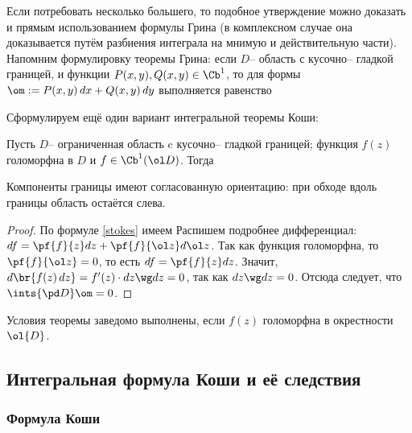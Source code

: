 \documentclass[a4paper]{article}
\begin{document}
Если потребовать несколько большего, то подобное утверждение можно доказать и прямым использованием
формулы Грина (в комплексном случае она доказывается путём разбиения интеграла на мнимую и действительную части).
Напомним формулировку теоремы Грина: если $D$-- область с кусочно-- гладкой границей, и функции $P(x,y), Q(x,y) \in \Cb^1$,
то для формы $\om := P(x,y)\,dx + Q(x,y)\,dy$ выполняется равенство

Сформулируем ещё один вариант интегральной теоремы Коши:
\begin{theorem}[Коши]
Пусть $D$-- ограниченная область c кусочно-- гладкой границей; функция $f(z)$ голоморфна в $D$ и $f\in \Cb^1(\ol D)$.
Тогда
\end{theorem}
\begin{note}
Компоненты границы имеют согласованную ориентацию: при обходе вдоль границы область остаётся слева.
\end{note}
\begin{proof}
По формуле \eqref{stokes} имеем
Распишем подробнее дифференциал: $df = \pf{f}{z}dz + \pf{f}{\ol z}d\ol z$. Так как функция голоморфна, то
$\pf{f}{\ol z} = 0$, то есть $df = \pf{f}{z}dz$.
Значит, $d\br{f(z)\,dz} = f'(z) \cdot dz \wg dz = 0$, так как $dz \wg dz = 0$. Отсюда следует,
что $\ints{\pd D}\om = 0$.
\end{proof}
\begin{note}
Условия теоремы заведомо выполнены, если $f(z)$ голоморфна в окрестности $\ol{D}$.
\end{note}

\subsection{Интегральная формула Коши и её следствия}

\subsubsection{Формула Коши}
\end{document}
